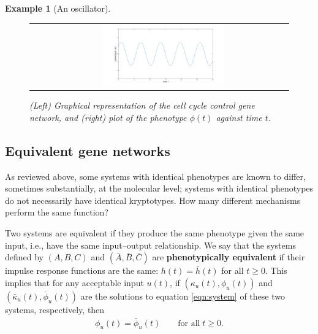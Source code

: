 \documentclass{article}
\newcommand{\1}{\mathbbm{1}}
\newtheorem{example}{Example}
\begin{document}
\begin{example}[An oscillator]
\begin{figure}[H]
\begin{tabular}{cc}
\begin{tikzpicture}
            \end{tikzpicture} &
      \includegraphics[width=0.5\textwidth, height=0.125\paperheight]{osc_impulse}
   \end{tabular}
      \caption{(Left) Graphical representation of the cell cycle control gene network, and (right) plot of the phenotype $\phi(t)$ against time $t$.} \label{fig:oscillator}
    \end{figure}
  \end{example}


\subsection*{Equivalent gene networks}

As reviewed above,
some systems with identical phenotypes are known to differ, sometimes substantially, at the molecular level; 
systems with identical phenotypes do not necessarily have identical kryptotypes.
How many different mechanisms perform the same function? 

Two systems are equivalent if they produce the same phenotype given the same input,
i.e., have the same input--output relationship.
We say that
the systems defined by $(A,B,C)$ and $(\bar A,\bar B,\bar C)$ are
\textbf{phenotypically equivalent} 
if their impulse response functions are the same:
$h(t) = \bar h(t)$ for all $t \ge 0$.
This implies that for any acceptable input $u(t)$,
if $(\kappa_u(t),\phi_u(t))$ and $(\bar \kappa_u(t),\bar \phi_u(t))$ are the solutions to equation \eqref{eqn:system}
of these two systems, respectively, then
\begin{align*}
      \phi_u(t) = \bar \phi_u(t) \qquad \text{for all} \; t \ge 0.
\end{align*}
\end{document}
